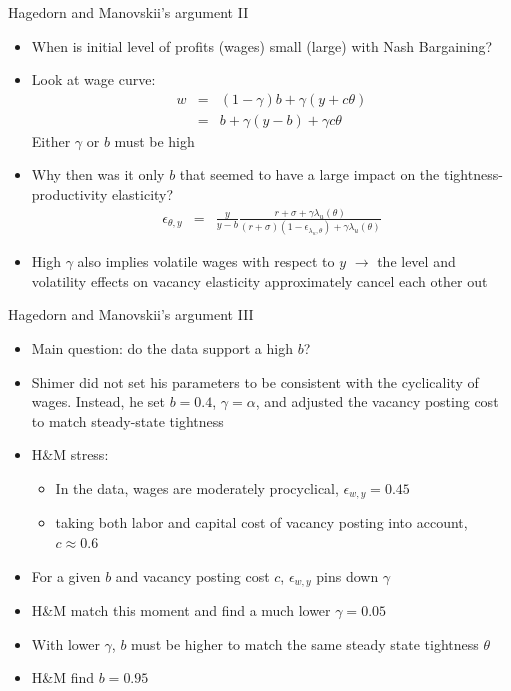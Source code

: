 \documentclass[9pt]{beamer}
\newcommand{\bit}{\begin{itemize}}
\newcommand{\eit}{\end{itemize}}
\begin{document}
\begin{frame}{Hagedorn and Manovskii's argument II}

\bit
\setlength\itemsep{2em}

\item When is initial level of profits (wages) small (large) with Nash Bargaining? 

\item Look at wage curve:
\begin{eqnarray}
w &=& (1-\gamma)b + \gamma (y +c \theta) \nonumber \\
&=& b + \gamma(y-b) + \gamma c \theta \nonumber
\end{eqnarray}
Either $\gamma$ or $b$ must be high

\item Why then was it only $b$ that seemed to have a large impact on the tightness-productivity elasticity?
\begin{eqnarray}
\epsilon_{\theta, y} &=& \frac{y}{y-b} \frac{r+ \sigma + \gamma \lambda_u(\theta)}{(r + \sigma)(1-\epsilon_{\lambda_u,\theta}) + \gamma \lambda_u(\theta)} \nonumber
\end{eqnarray}

\item High $\gamma$ also implies volatile wages with respect to $y$ $\rightarrow$ the level and volatility effects on vacancy elasticity approximately cancel each other out


\eit
\end{frame}


\begin{frame}{Hagedorn and Manovskii's argument III}

\bit
\setlength\itemsep{1.5em}

\item Main question: do the data support a high $b$?

\item Shimer did not set his parameters to be consistent with the cyclicality of wages. Instead, he set $b=0.4$, $\gamma = \alpha$, and adjusted the vacancy posting cost to match steady-state tightness

\item H\&M stress:
\bit
	\item In the data, wages are moderately procyclical, $\epsilon_{w, y} = 0.45$
	
	\item taking both labor and capital cost of vacancy posting into account, $c \approx 0.6$
\eit

\item For a given $b$ and vacancy posting cost $c$, $\epsilon_{w, y}$ pins down $\gamma$

\item H\&M match this moment and find a much lower $\gamma = 0.05$

\item With lower $\gamma$, $b$ must be higher to match the same steady state tightness $\theta$

\item H\&M find $b=0.95$

\eit
\end{frame}
\end{document}
